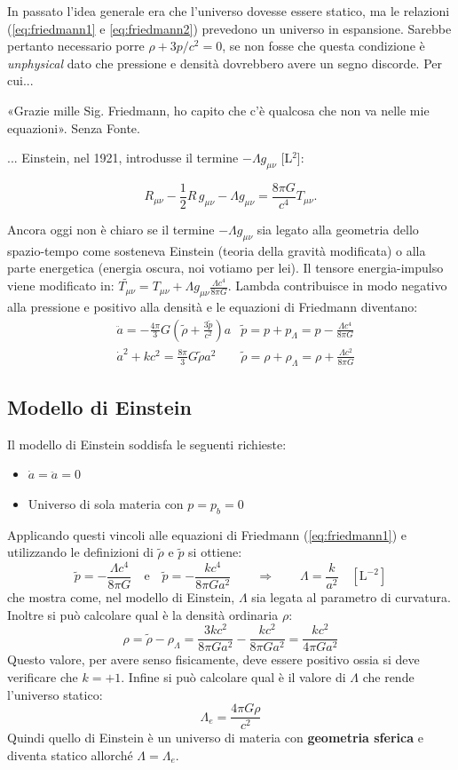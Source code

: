 In passato l'idea generale era che l'universo dovesse essere statico, ma le relazioni (\ref{eq:friedmann1} e \ref{eq:friedmann2}) prevedono un universo in espansione. Sarebbe pertanto necessario porre $\rho + 3p/c^2 = 0$, se non fosse che questa condizione è \textit{unphysical} dato che pressione e densità dovrebbero avere un segno discorde. Per cui...
\begin{definition}[Einstein:]
«Grazie mille Sig. Friedmann, ho capito che c'è qualcosa che non va nelle mie equazioni». Senza Fonte.
\end{definition}
... Einstein, nel 1921, introdusse il termine $- \Lambda g_{\mu \nu}$ [L$^2$]:

$$R_{\mu \nu} - \frac{1}{2} R \, g_{\mu \nu} - \Lambda g_{\mu \nu}= \frac{8 \pi G}{c^4} T_{\mu \nu}.$$

Ancora oggi non è chiaro se il termine $- \Lambda g_{\mu \nu}$ sia legato alla geometria dello spazio-tempo come sosteneva Einstein (teoria della gravità modificata) o alla parte energetica (energia oscura, noi votiamo per lei).  
Il tensore energia-impulso viene modificato in: $\tilde{T_{\mu \nu}}=T_{\mu \nu}+\Lambda g_{\mu \nu}\frac{\Lambda c^4}{8 \pi G}$. Lambda contribuisce in modo negativo alla pressione e positivo alla densità e le equazioni di Friedmann diventano:
\begin{align}
   & \ddot{a}  =-\frac{4\pi}{3}G\left ( \tilde{\rho}+\frac{3\tilde{p}}{c^2} \right )a & \tilde{p}=p + p_\Lambda = p - \frac{\Lambda c^4}{8 \pi G}  \label{eq:friedmann1tilde} \\
   & \dot{a}^2+kc^2  =\frac{8\pi}{3}G\tilde{\rho} a^2 & \tilde{\rho}=\rho + \rho_\Lambda = \rho + \frac{\Lambda c^2}{8 \pi G} \label{eq:friedmann2tilde}
\end{align}


\subsection{Modello di Einstein}
Il modello di Einstein soddisfa le seguenti richieste: 
\begin{itemize}
    \item $\dot{a}=\ddot{a}=0$
    \item Universo di sola materia con $p=p_b=0$
\end{itemize}
Applicando questi vincoli alle equazioni di Friedmann (\ref{eq:friedmann1}) e utilizzando le definizioni di $\tilde{\rho}$ e $\tilde{p} $ si ottiene:
$$
\tilde{p}= -\frac{\Lambda c^4}{8 \pi G}\quad \mathrm{e}\quad \tilde{p} = - \frac{k c^4}{8 \pi G a^2} \qquad  \Rightarrow \qquad \Lambda=\frac{k}{a^2}\quad \mathrm{[L^{-2}]}
$$
che mostra come, nel modello di Einstein, $\Lambda$ sia legata al parametro di curvatura. Inoltre si può calcolare qual è la densità ordinaria $\rho$:
$$
\rho = \tilde{\rho} - \rho_\Lambda = \frac{3 k c^2}{8 \pi G a^2} - \frac{k c^2}{8 \pi G a^2}=\frac{k c^2}{4 \pi G a^2}
$$
Questo valore, per avere senso fisicamente, deve essere positivo ossia si deve verificare che $k=+1$.
Infine si può calcolare qual è il valore di $\Lambda$ che rende l'universo statico:
$$
\Lambda_e = \frac{4\pi G\rho}{c^2}
$$
Quindi quello di Einstein è un universo di materia con \textbf{geometria sferica} e diventa statico allorché $\Lambda =\Lambda_e$. 

